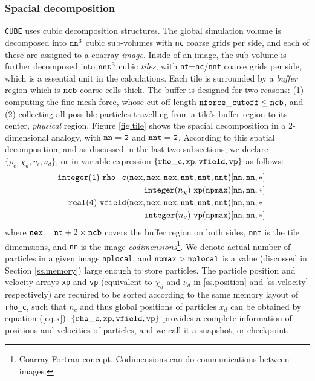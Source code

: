 \documentclass[10pt,twocolumn,preprint]{emulateapj}
\begin{document}
\subsubsection{Spacial decomposition}\label{sss.spatial_decomposition}
{\tt CUBE} uses cubic decomposition structures. The global simulation volume is decomposed into ${\tt nn}^3$ cubic sub-volumes with {\tt nc} coarse grids per side, and each of these are assigned to a coarray {\it image}. Inside of an image, the sub-volume is further decomposed into ${\tt nnt}^3$ cubic {\it tiles}, with {\tt nt}={\tt nc}/{\tt nnt} coarse grids per side, which is a essential unit in the calculations. Each tile is surrounded by a {\it buffer} region which is ${\tt ncb}$ coarse cells thick. The buffer is designed for two reasons: (1) computing the fine mesh force, whose cut-off length ${\tt nforce\_cutoff}\leq{\tt ncb}$, and (2) collecting all possible particles travelling from a tile's buffer region to its center, {\it physical} region. Figure \ref{fig.tile} shows the spacial decomposition in a 2-dimensional analogy, with ${\tt nn=2}$ and ${\tt nnt=2}$. According to this spatial decomposition, and as discussed in the last two subsections, we declare $\{\rho_c,\chi_d,v_c,\nu_d\}$, or in variable expression $\{{\tt rho\_c},{\tt xp},{\tt vfield},{\tt vp}\}$ as follows:
\begin{eqnarray*}
	&&{\tt integer(1)\ rho\_c(nex,nex,nex,nnt,nnt,nnt)[nn,nn,*]}\\
	&&{\tt integer(}n_\chi{\tt )\ xp(npmax)[nn,nn,*]}\\
	&&{\tt real(4)\ vfield(nex,nex,nex,nnt,nnt,nnt)[nn,nn,*]}\\
	&&{\tt integer(}n_\nu{\tt )\ vp(npmax)[nn,nn,*]}
\end{eqnarray*}
where ${\tt nex}={\tt nt}+2\times{\tt ncb}$ covers the buffer region on both sides, {\tt nnt} is the tile dimemsions, and {\tt nn} is the image {\it codimensions}\footnote{Coarray Fortran concept. Codimensions can do communications between images.}. We denote actual number of particles in a given image {\tt nplocal}, and ${\tt npmax}>{\tt nplocal}$ is a value (discussed in Section \ref{ss.memory}) large enough to store particles. The particle position and velocity arrays {\tt xp} and {\tt vp} (equivalent to $\chi_d$ and $\nu_d$ in \ref{ss.position} and \ref{ss.velocity} respectively) are required to be sorted according to the same memory layout of {\tt rho\_c}, such that $n_c$ and thus global positions of particles $x_d$ can be obtained by equation (\ref{eq.x}). $\{{\tt rho\_c},{\tt xp},{\tt vfield},{\tt vp}\}$ provides a complete information of positions and velocities of particles, and we call it a snapshot, or checkpoint.
\end{document}
